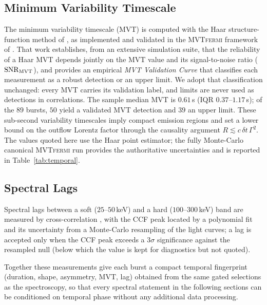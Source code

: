 \subsection{Minimum Variability Timescale} \label{sec:mvt}

The minimum variability timescale (MVT) is computed with the Haar
structure-function method of \citet{Golkhou2014,Golkhou2015}, as implemented
and validated in the \textsc{MVTfermi} framework of \citet{Bala2025}. That
work establishes, from an extensive simulation suite, that the reliability of
a Haar MVT depends jointly on the MVT value and its signal-to-noise ratio
($\mathrm{SNR}_{\rm MVT}$), and provides an empirical \emph{MVT Validation
Curve} that classifies each measurement as a robust detection or an upper
limit. We adopt that classification unchanged: every MVT carries its
validation label, and limits are never used as detections in correlations.
The sample median MVT is $0.61$\,s (IQR $0.37$--$1.17$\,s); of the $89$
bursts, $50$ yield a validated MVT detection and $39$ an upper limit. These
sub-second variability timescales imply compact emission regions and set a
lower bound on the outflow Lorentz factor through the causality argument
$R \lesssim c\,\delta t\,\Gamma^{2}$. The values quoted here use the Haar
point estimator; the fully Monte-Carlo canonical \textsc{MVTfermi} run
provides the authoritative uncertainties and is reported in
Table~\ref{tab:temporal}.

\subsection{Spectral Lags} \label{sec:lags}

Spectral lags between a soft ($25$--$50$\,keV) and a hard ($100$--$300$\,keV)
band are measured by cross-correlation \citep{Norris1996}, with the CCF peak
located by a polynomial fit and its uncertainty from a Monte-Carlo resampling
of the light curves; a lag is accepted only when the CCF peak exceeds a
$3\sigma$ significance against the resampled null (below which the value is
kept for diagnostics but not quoted). 

Together these measurements give each burst a compact temporal fingerprint
(duration, shape, asymmetry, MVT, lag) obtained from the same gated selections
as the spectroscopy, so that every spectral statement in the following
sections can be conditioned on temporal phase without any additional data
processing.
